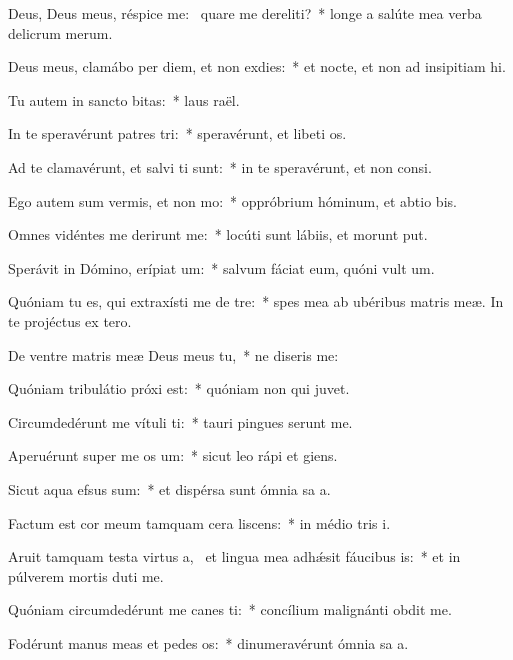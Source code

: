 \item Deus, Deus meus, réspice  me:~\pscross{} quare me dereliti?~* longe a salúte mea verba delicrum merum.
\item Deus meus, clamábo per diem, et non exdies:~* et nocte, et non ad insipitiam hi.
\item Tu autem in sancto bitas:~* laus raël.
\item In te speravérunt patres tri:~* speravérunt, et libeti os.
\item Ad te clamavérunt, et salvi ti sunt:~* in te speravérunt, et non  consi.
\item Ego autem sum vermis, et non mo:~* oppróbrium hóminum, et abtio bis.
\item Omnes vidéntes me derirunt me:~* locúti sunt lábiis, et morunt put.
\item Sperávit in Dómino, erípiat um:~* salvum fáciat eum, quóni vult um.
\item Quóniam tu es, qui extraxísti me de tre:~* spes mea ab ubéribus matris meæ. In te projéctus  ex tero.
\item De ventre matris meæ Deus meus  tu,~* ne diseris  me:
\item Quóniam tribulátio próxi est:~* quóniam non  qui juvet.
\item Circumdedérunt me vítuli ti:~* tauri pingues serunt me.
\item Aperuérunt super me os um:~* sicut leo rápi et giens.
\item Sicut aqua efsus sum:~* et dispérsa sunt ómnia sa a.
\item Factum est cor meum tamquam cera liscens:~* in médio tris i.
\item Aruit tamquam testa virtus a,~\pscross{} et lingua mea adhǽsit fáucibus is:~* et in púlverem mortis duti me.
\item Quóniam circumdedérunt me canes ti:~* concílium malignánti obdit me.
\item Fodérunt manus meas et pedes os:~* dinumeravérunt ómnia sa a.
